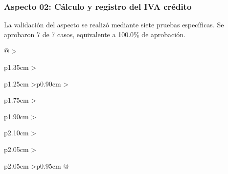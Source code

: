 \subsubsection{Aspecto 02: Cálculo y registro del IVA crédito}
La validación del aspecto se realizó mediante siete pruebas específicas. Se aprobaron 7 de 7 casos, equivalente a 100.0\% de aprobación.

\begingroup\fontsize{8}{10}\selectfont\renewcommand{\arraystretch}{1.25}\setlength{\tabcolsep}{2pt}
\begin{xltabular}{\linewidth}{@{}
>{\raggedright\arraybackslash}p{1.35cm}
>{\raggedright\arraybackslash}p{1.25cm}
>{\centering\arraybackslash}p{0.90cm}
>{\raggedright\arraybackslash}p{1.75cm}
>{\raggedright\arraybackslash}p{1.90cm}
>{\raggedright\arraybackslash}p{2.10cm}
>{\raggedright\arraybackslash}p{2.05cm}
>{\raggedright\arraybackslash}p{2.05cm}
>{\centering\arraybackslash}p{0.95cm}
@{}}


\end{xltabular}
